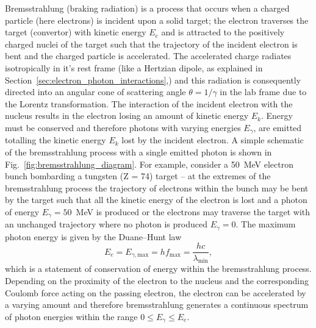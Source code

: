 \documentclass[../main.tex]{subfiles}
\begin{document}
Bremsstrahlung (braking radiation) is a process that occurs when a charged particle (here electrons) is incident upon a solid target; the electron traverses the target (convertor) with kinetic energy $E_{e}$ and is attracted to the positively charged nuclei of the target such that the trajectory of the incident electron is bent and the charged particle is accelerated. The accelerated charge radiates  isotropically in it's rest frame (like a Hertzian dipole, as explained in Section~\ref{sec:electron_photon_interactions},) and this radiation is consequently directed into an angular cone of scattering angle $\theta=1/\gamma$ in the lab frame due to the Lorentz transformation. The interaction of the incident electron with the nucleus results in the electron losing an amount of kinetic energy $E_{k}$. Energy must be conserved and therefore photons with varying energies $E_{\gamma}$, are emitted totalling the kinetic energy $E_{k}$ lost by the incident electron. A simple schematic of the bremsstrahlung process with a single emitted photon is shown in Fig.~\ref{fig:bremsstrahlung_diagram}. For example, consider a 50~\si{\mega\electronvolt} electron bunch bombarding a tungsten (Z = 74) target -- at the extremes of the bremsstrahlung process the trajectory of electrons within the bunch may be bent by the target such that all the kinetic energy of the electron is lost and a photon of energy $E_{\gamma}=50$~\si{\mega\electronvolt} is produced or the electrons may traverse the target with an unchanged trajectory where no photon is produced $E_{\gamma}=0$. The maximum photon energy is given by the Duane--Hunt law \cite{duane1915xray}
\begin{equation}
E_{e} = E_{\gamma,\mathrm{max}} = hf_{\mathrm{max}} = \frac{hc}{\lambda_{\mathrm{min}}},
\label{eq:Duane_Hunt_law}    
\end{equation}
which is a statement of conservation of energy within the bremsstrahlung process. Depending on the proximity of the electron to the nucleus and the corresponding Coulomb force acting on the passing electron, the electron can be accelerated by a varying amount and therefore bremsstrahlung generates a continuous spectrum of photon energies within the range $0 \leq E_{\gamma} \leq E_{e}$.
\end{document}

